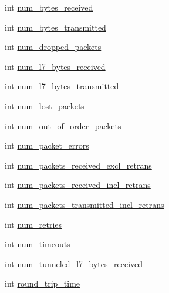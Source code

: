 \begin{DoxyCompactItemize}
\item 
int \hyperlink{structmobile__gtp__per__flow__metrics_a91030f1538091586266af95949b0f38d}{num\+\_\+bytes\+\_\+received}
\item 
int \hyperlink{structmobile__gtp__per__flow__metrics_af83236faaa6dcc15f228a450552c783a}{num\+\_\+bytes\+\_\+transmitted}
\item 
int \hyperlink{structmobile__gtp__per__flow__metrics_ac0a5f2f84f0d6276934ef0e74d839d2b}{num\+\_\+dropped\+\_\+packets}
\item 
int \hyperlink{structmobile__gtp__per__flow__metrics_a9788dcc2ec1a869a02d9c23d4ace03ec}{num\+\_\+l7\+\_\+bytes\+\_\+received}
\item 
int \hyperlink{structmobile__gtp__per__flow__metrics_aa3b9a7d4ed676251bae39b1f7727aca2}{num\+\_\+l7\+\_\+bytes\+\_\+transmitted}
\item 
int \hyperlink{structmobile__gtp__per__flow__metrics_a6c80c85063b326f5a93f317bab5c2f50}{num\+\_\+lost\+\_\+packets}
\item 
int \hyperlink{structmobile__gtp__per__flow__metrics_aa05dc7172d20af02cc149ba0e7c107c1}{num\+\_\+out\+\_\+of\+\_\+order\+\_\+packets}
\item 
int \hyperlink{structmobile__gtp__per__flow__metrics_a725c6df6d0d9500a66a2e76d287ab846}{num\+\_\+packet\+\_\+errors}
\item 
int \hyperlink{structmobile__gtp__per__flow__metrics_acf425688d9e57410b51665364ffa6026}{num\+\_\+packets\+\_\+received\+\_\+excl\+\_\+retrans}
\item 
int \hyperlink{structmobile__gtp__per__flow__metrics_ac89cedc8385acca3803135e8cd36db23}{num\+\_\+packets\+\_\+received\+\_\+incl\+\_\+retrans}
\item 
int \hyperlink{structmobile__gtp__per__flow__metrics_ac4db5d2e2c72d0e6844b1049d6b583dd}{num\+\_\+packets\+\_\+transmitted\+\_\+incl\+\_\+retrans}
\item 
int \hyperlink{structmobile__gtp__per__flow__metrics_aa23128f878c58eb3ba1fd600b17e1035}{num\+\_\+retries}
\item 
int \hyperlink{structmobile__gtp__per__flow__metrics_ae5e12712977ed14f607d694bebf3240e}{num\+\_\+timeouts}
\item 
int \hyperlink{structmobile__gtp__per__flow__metrics_a17d08c56a1594ed2d6eb5f9327e4d7ef}{num\+\_\+tunneled\+\_\+l7\+\_\+bytes\+\_\+received}
\item 
int \hyperlink{structmobile__gtp__per__flow__metrics_a7f386f878d1f286708a6b3994e53352b}{round\+\_\+trip\+\_\+time}
\item 

\end{DoxyCompactItemize}

